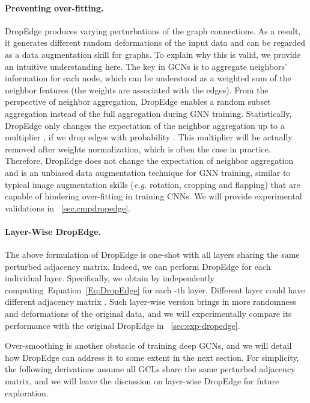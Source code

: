 \documentclass{article}
\def\Eqref#1{Equation~\ref{#1}}
\begin{document}
\paragraph{Preventing over-fitting.}
DropEdge produces varying perturbations of the graph connections. As a result, it generates different random deformations of the input data and can be regarded as a data augmentation skill for graphs. To explain why this is valid, we provide an intuitive understanding here.
The key in GCNs is to aggregate neighbors' information for each node, which can be understood as a weighted sum of the neighbor features (the weights are associated with the edges). From the perspective of neighbor aggregation, DropEdge enables a random subset aggregation instead of the full aggregation during GNN training. Statistically, DropEdge only changes the expectation of the neighbor aggregation up to a multiplier , if we drop edges with probability . This multiplier will be actually removed after weights normalization, which is often the case in practice. Therefore, DropEdge does not change the expectation of neighbor aggregation and is an unbiased data augmentation technique for GNN training, similar to typical image augmentation skills (\emph{e.g.} rotation, cropping and flapping) that are capable of hindering over-fitting in training CNNs. We will provide experimental validations in \textsection~\ref{sec.cmpdropedge}.



\paragraph{Layer-Wise DropEdge.}
The above formulation of DropEdge is one-shot with all layers sharing the same perturbed adjacency matrix. Indeed, we can perform DropEdge for each individual layer. Specifically, we obtain  by independently computing~\Eqref{Eq:DropEdge} for each -th layer. Different layer could have different adjacency matrix . Such layer-wise version brings in more randomness and deformations of the original data, and we will experimentally compare its performance with the original DropEdge in \textsection~\ref{sec:exp-dropedge}.

Over-smoothing is another obstacle of training deep GCNs, and we will detail how DropEdge can address it to some extent in the next section. For simplicity, the following derivations assume all GCLs share the same perturbed adjacency matrix, and we will leave the discussion on layer-wise DropEdge for future exploration.
\end{document}

